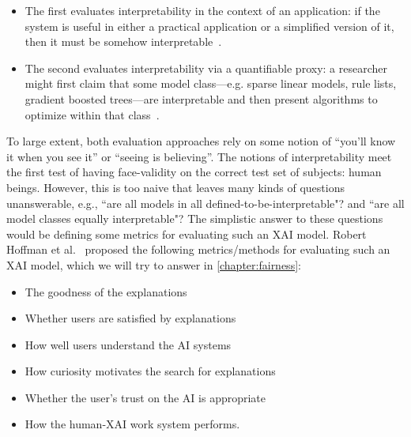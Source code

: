 \begin{itemize}[noitemsep]
    \item The first evaluates interpretability in the context of an application: if the system is useful in either a practical application or a simplified version of it, then it must be somehow interpretable~\cite{bhatt2020explainable}. 
    \item The second evaluates interpretability via a quantifiable proxy: a researcher might first claim that some model class—e.g. sparse linear models, rule lists, gradient boosted  trees—are interpretable and then present algorithms to optimize within that class~\cite{miller2018explanation}. 
\end{itemize}

\hspace*{3.5mm} To large extent, both evaluation approaches rely on some notion of ``you’ll know it when you see it'' or ``seeing is believing''. The notions of interpretability meet the first test of having face-validity on the correct test set of subjects: human beings. However, this is too naive that leaves many kinds of questions unanswerable, e.g., ``are all models in all defined-to-be-interpretable"? and ``are all model classes equally interpretable"? The simplistic answer to these questions would be defining some metrics for evaluating such an XAI model. Robert Hoffman et al.~\cite{hoffman2018metrics} proposed the following metrics/methods for evaluating such an XAI model, which we will try to answer in \cref{chapter:fairness}:

\begin{itemize}[noitemsep]
    \item The goodness of the explanations
    \item Whether users are satisfied by explanations
    \item How well users understand the AI systems
    \item How curiosity motivates the search for explanations
    \item Whether the user's trust on the AI is appropriate
    \item How the human-XAI work system performs.
\end{itemize}
\fi 

